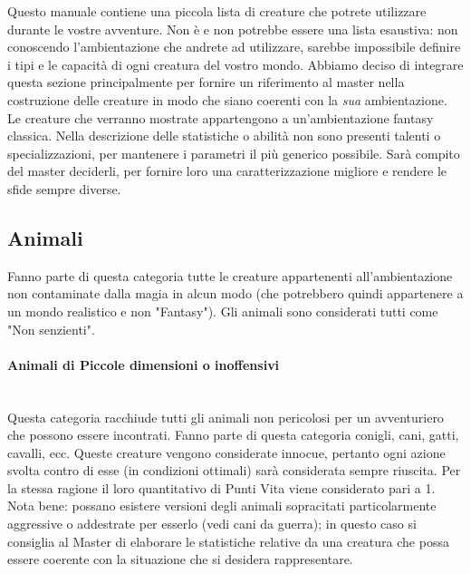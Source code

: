 \documentclass[../manuale_main.tex]{subfiles}
\begin{document}
Questo manuale contiene una piccola lista di creature che potrete utilizzare durante le vostre avventure. Non è e non potrebbe essere una lista esaustiva: non conoscendo l'ambientazione che andrete ad utilizzare, sarebbe impossibile definire i tipi e le capacità di ogni creatura del vostro mondo. Abbiamo deciso di integrare questa sezione principalmente per fornire un riferimento al master nella costruzione delle creature in modo che siano coerenti con la \emph{sua} ambientazione.\\
Le creature che verranno mostrate appartengono a un'ambientazione fantasy classica.
Nella descrizione delle statistiche o abilità non sono presenti talenti o specializzazioni, per mantenere i parametri il più generico possibile. Sarà compito del master deciderli, per fornire loro una caratterizzazione migliore e rendere le sfide sempre diverse.

\subsection{Animali}
Fanno parte di questa categoria tutte le creature appartenenti all'ambientazione non contaminate dalla magia in alcun modo (che potrebbero quindi appartenere a un mondo realistico e non "Fantasy"). Gli animali sono considerati tutti come "Non senzienti".

\paragraph{Animali di Piccole dimensioni o inoffensivi}\mbox{}\\ 
Questa categoria racchiude tutti gli animali non pericolosi per un avventuriero che possono essere incontrati. Fanno parte di questa categoria conigli, cani, gatti, cavalli, ecc. Queste creature vengono considerate innocue, pertanto ogni azione svolta contro di esse (in condizioni ottimali) sarà considerata sempre riuscita. Per la stessa ragione il loro quantitativo di Punti Vita viene considerato pari a 1. Nota bene: possano esistere versioni degli animali sopracitati particolarmente aggressive o addestrate per esserlo (vedi cani da guerra); in questo caso si consiglia al Master di elaborare le statistiche relative da una creatura che possa essere coerente con la situazione che si desidera rappresentare.
\end{document}
